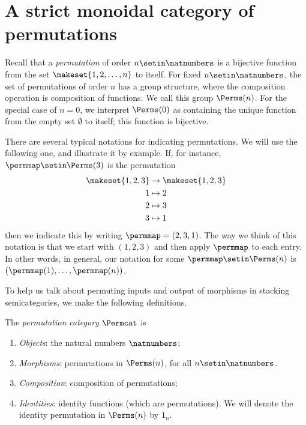 
\section{A strict monoidal category of permutations}
\label{sec:parallelism-and-permutations}



Recall that a \emph{permutation} of order $n \setin\natnumbers$ is a bijective function from the set $\makeset{1,2, \dots , n}$ to itself.
For fixed $n \setin\natnumbers$, the set of permutations of order $n$ has a group structure, where the composition operation is composition of functions.
We call this group $\Perms(n)$.
For the special case of $n = 0$, we interpret $\Perms(0)$ as containing the unique function from the empty set $\emptyset$ to itself; this function is bijective.

There are several typical notations for indicating permutations.
We will use the following one, and illustrate it by example.
If, for instance, $\permmap \setin \Perms(3)$ is the permutation
\begin{align*}
    \makeset{1,2,3} & \to \makeset{1,2,3} \\
    1               & \mapsto 2 \\
    2               & \mapsto 3 \\
    3               & \mapsto 1
\end{align*}
then we indicate this by writing $\permmap = (2, 3, 1)$.
The way we think of this notation is that we start with $(1, 2, 3)$ and then apply $\permmap$ to each entry.
In other words, in general, our notation for some $\permmap \setin \Perms(n)$ is $(\permmap(1), \dots, \permmap(n))$.

To help us talk about permuting inputs and output of morphisms in stacking semicategories, we make the following definitions.

\begin{definition}\label{def:Permcat}
    The \emph{permutation category} $\Permcat$ is
    \begin{enumerate}
        \item \emph{Objects}: the natural numbers $\natnumbers$;
        \item \emph{Morphisms}: permutations in $\Perms(n)$, for all $n \setin \natnumbers$.
        \item \emph{Composition}: composition of permutations;
        \item \emph{Identities}: identity functions (which are permutations).
              We will denote the identity permutation in $\Perms(n)$ by $1_n$.
    \end{enumerate}
\end{definition}

